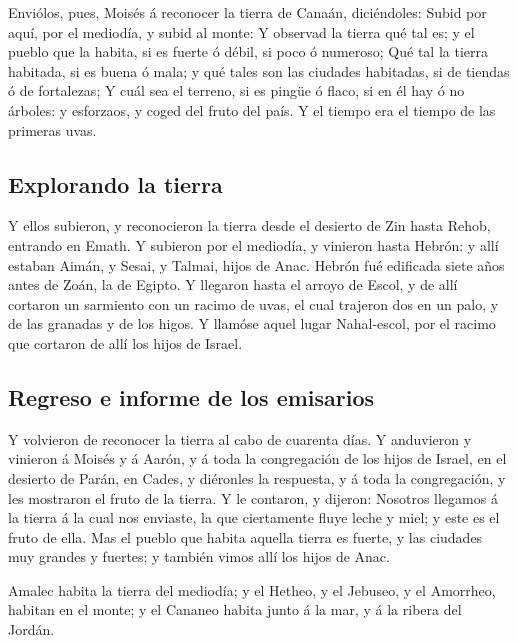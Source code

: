  Enviólos, pues, Moisés á reconocer la tierra de Canaán,
diciéndoles: Subid por aquí, por el mediodía, y subid al monte:
 Y observad la tierra qué tal es; y el pueblo que la
habita, si es fuerte ó débil, si poco ó numeroso;  Qué tal
la tierra habitada, si es buena ó mala; y qué tales son las ciudades
habitadas, si de tiendas ó de fortalezas;  Y cuál sea el
terreno, si es pingüe ó flaco, si en él hay ó no árboles: y esforzaos, y
coged del fruto del país. Y el tiempo era el tiempo de las primeras
uvas.

\hypertarget{explorando-la-tierra}{%
\subsection{Explorando la tierra}\label{explorando-la-tierra}}

 Y ellos subieron, y reconocieron la tierra desde el
desierto de Zin hasta Rehob, entrando en Emath.  Y subieron
por el mediodía, y vinieron hasta Hebrón: y allí estaban Aimán, y Sesai,
y Talmai, hijos de Anac. Hebrón fué edificada siete años antes de Zoán,
la de Egipto.  Y llegaron hasta el arroyo de Escol, y de
allí cortaron un sarmiento con un racimo de uvas, el cual trajeron dos
en un palo, y de las granadas y de los higos.  Y llamóse
aquel lugar Nahal-escol, por el racimo que cortaron de allí los hijos de
Israel.

\hypertarget{regreso-e-informe-de-los-emisarios}{%
\subsection{Regreso e informe de los
emisarios}\label{regreso-e-informe-de-los-emisarios}}

 Y volvieron de reconocer la tierra al cabo de cuarenta
días.  Y anduvieron y vinieron á Moisés y á Aarón, y á toda
la congregación de los hijos de Israel, en el desierto de Parán, en
Cades, y diéronles la respuesta, y á toda la congregación, y les
mostraron el fruto de la tierra.  Y le contaron, y dijeron:
Nosotros llegamos á la tierra á la cual nos enviaste, la que ciertamente
fluye leche y miel; y este es el fruto de ella.  Mas el
pueblo que habita aquella tierra es fuerte, y las ciudades muy grandes y
fuertes; y también vimos allí los hijos de Anac.

 Amalec habita la tierra del mediodía; y el Hetheo, y el
Jebuseo, y el Amorrheo, habitan en el monte; y el Cananeo habita junto á
la mar, y á la ribera del Jordán.

